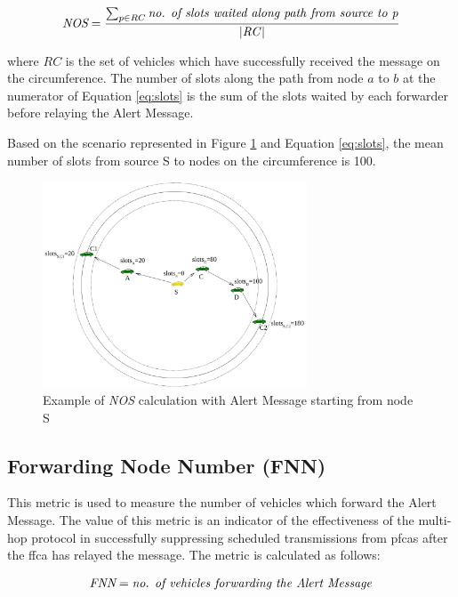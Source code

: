 			\begin{gather}
				\label{eq:slots}
				\textit{NOS} = \frac{ \sum_{p \in RC } \textrm{\textit{no. of slots waited along path from source to p}}}  {\textrm{|\textit{RC}|}}
			\end{gather}	
	
			where $RC$ is the set of vehicles which have successfully received the message on the circumference.
			The number of slots along the path from node $a$ to $b$ at the numerator of Equation \ref{eq:slots} is the sum of the slots waited by each forwarder before relaying the Alert Message. 
			
			
			Based on the scenario represented in Figure \ref{fig:slots} and Equation \ref{eq:slots}, the mean number of slots from source S to nodes on the circumference is 100.
			
			\begin{figure}[H]
				\centering
				\includegraphics[width=0.7\textwidth]{immagini/slots}
				\caption{Example of \textit{NOS} calculation with Alert Message starting from node S}
				\label{fig:slots}
			\end{figure}
			
			
		\subsection{Forwarding Node Number (FNN)}
			This metric is used to measure the number of vehicles which forward the Alert Message. The value of this metric is an indicator of the effectiveness of the multi-hop protocol in successfully suppressing scheduled transmissions from \acrshort{pfca}s after the \acrshort{ffca} has relayed the message. The metric is calculated as follows:
			 
			\begin{gather}
				\label{eq:nos}
				\textit{FNN} = \textrm{\textit{no. of vehicles forwarding the Alert Message}}
			\end{gather}	
				

